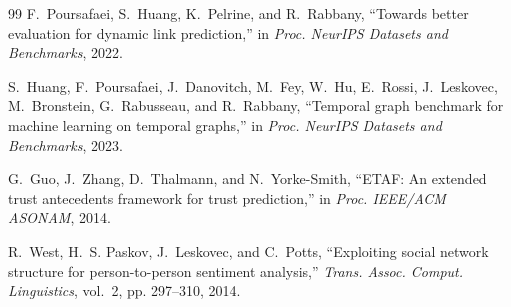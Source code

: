 \documentclass[conference]{IEEEtran}
\begin{document}
\begin{thebibliography}{99}
F.~Poursafaei, S.~Huang, K.~Pelrine, and R.~Rabbany, ``Towards better evaluation for dynamic link prediction,'' in \emph{Proc. NeurIPS Datasets and Benchmarks}, 2022.

S.~Huang, F.~Poursafaei, J.~Danovitch, M.~Fey, W.~Hu, E.~Rossi, J.~Leskovec, M.~Bronstein, G.~Rabusseau, and R.~Rabbany, ``Temporal graph benchmark for machine learning on temporal graphs,'' in \emph{Proc. NeurIPS Datasets and Benchmarks}, 2023.

G.~Guo, J.~Zhang, D.~Thalmann, and N.~Yorke-Smith, ``ETAF: An extended trust antecedents framework for trust prediction,'' in \emph{Proc. IEEE/ACM ASONAM}, 2014.

R.~West, H.~S. Paskov, J.~Leskovec, and C.~Potts, ``Exploiting social network structure for person-to-person sentiment analysis,'' \emph{Trans. Assoc. Comput. Linguistics}, vol.~2, pp. 297--310, 2014.

\end{thebibliography}
\end{document}

